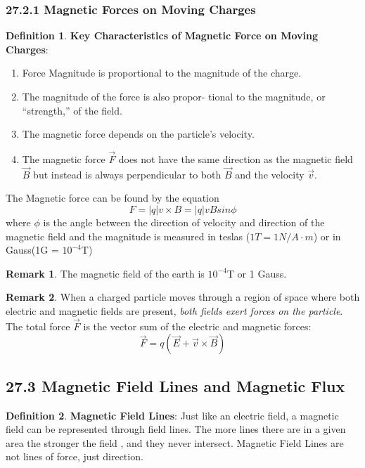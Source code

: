 \documentclass[12pt]{amsart}
\theoremstyle{definition}
\newtheorem{definition}{Definition} %
\newtheorem*{remark}{Remark}        %
\numberwithin{equation}{theorem}    %
\begin{document}
\subsubsection*{27.2.1 Magnetic Forces on Moving Charges}

\begin{definition}
    \textbf{Key Characteristics of Magnetic Force on Moving Charges}:
    \begin{enumerate}
        \item Force Magnitude is proportional to the magnitude of the charge.
        \item The magnitude of the force is also propor- tional to the magnitude, or “strength,” of the field.
        \item The magnetic force depends on the particle’s
        velocity.
        \item The magnetic force $\vec{F}$ does not have the same direction as the magnetic field $\vec{B}$ but instead is always perpendicular to both $\vec{B}$ and the velocity $\vec{v}$. 
    \end{enumerate}
    The Magnetic force can be found by the equation $$F = |q|v \times B = |q|vBsin\phi$$ where $\phi$ is the angle between the direction of velocity and direction of the magnetic field and the magnitude is measured in teslas ($1T = 1N/A \cdot m$) or in Gauss(1G = $10^{-4}$T)
    \begin{remark}
        The magnetic field of the earth is $10^{-4}$T or 1 Gauss.
    \end{remark}
\end{definition}

\begin{remark}
    When a charged particle moves through a region of space where both electric and magnetic fields are present, \textit{both fields exert forces on the particle}. The total force $\vec{F}$ is the vector sum of the electric and magnetic forces: $$\vec{F}=q(\vec{E} + \vec{v}\times \vec{B})$$
\end{remark}

\subsection*{27.3 Magnetic Field Lines and Magnetic Flux}

\begin{definition}
    \textbf{Magnetic Field Lines}:
    Just like an electric field, a magnetic field can be represented through field lines. The more lines there are in a given area the stronger the field , and they never intersect. Magnetic Field Lines are not lines of force, just direction.
\end{definition}
\end{document}
